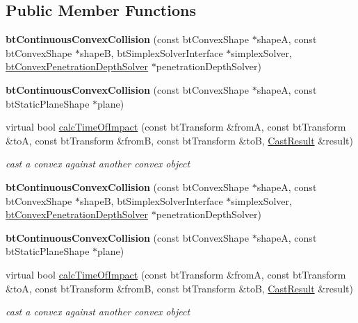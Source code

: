 \subsection*{Public Member Functions}
\begin{DoxyCompactItemize}
\item 
\mbox{\label{classbtContinuousConvexCollision_a6c89f3b4ba10699790f486c1ab278159}} 
{\bfseries bt\+Continuous\+Convex\+Collision} (const bt\+Convex\+Shape $\ast$shapeA, const bt\+Convex\+Shape $\ast$shapeB, bt\+Simplex\+Solver\+Interface $\ast$simplex\+Solver, \hyperlink{classbtConvexPenetrationDepthSolver}{bt\+Convex\+Penetration\+Depth\+Solver} $\ast$penetration\+Depth\+Solver)
\item 
\mbox{\label{classbtContinuousConvexCollision_a5ee898b00f7a69d8815a4a9e90bef415}} 
{\bfseries bt\+Continuous\+Convex\+Collision} (const bt\+Convex\+Shape $\ast$shapeA, const bt\+Static\+Plane\+Shape $\ast$plane)
\item 
virtual bool \hyperlink{classbtContinuousConvexCollision_afc75a57bddfeded52781bbd65ee16f37}{calc\+Time\+Of\+Impact} (const bt\+Transform \&fromA, const bt\+Transform \&toA, const bt\+Transform \&fromB, const bt\+Transform \&toB, \hyperlink{structbtConvexCast_1_1CastResult}{Cast\+Result} \&result)
\begin{DoxyCompactList}\small\item\em cast a convex against another convex object \end{DoxyCompactList}\item 
\mbox{\label{classbtContinuousConvexCollision_a6c89f3b4ba10699790f486c1ab278159}} 
{\bfseries bt\+Continuous\+Convex\+Collision} (const bt\+Convex\+Shape $\ast$shapeA, const bt\+Convex\+Shape $\ast$shapeB, bt\+Simplex\+Solver\+Interface $\ast$simplex\+Solver, \hyperlink{classbtConvexPenetrationDepthSolver}{bt\+Convex\+Penetration\+Depth\+Solver} $\ast$penetration\+Depth\+Solver)
\item 
\mbox{\label{classbtContinuousConvexCollision_a5ee898b00f7a69d8815a4a9e90bef415}} 
{\bfseries bt\+Continuous\+Convex\+Collision} (const bt\+Convex\+Shape $\ast$shapeA, const bt\+Static\+Plane\+Shape $\ast$plane)
\item 
\mbox{\label{classbtContinuousConvexCollision_a7c15d7830cbfed7934ed1f441bc394cd}} 
virtual bool \hyperlink{classbtContinuousConvexCollision_a7c15d7830cbfed7934ed1f441bc394cd}{calc\+Time\+Of\+Impact} (const bt\+Transform \&fromA, const bt\+Transform \&toA, const bt\+Transform \&fromB, const bt\+Transform \&toB, \hyperlink{structbtConvexCast_1_1CastResult}{Cast\+Result} \&result)
\begin{DoxyCompactList}\small\item\em cast a convex against another convex object \end{DoxyCompactList}\end{DoxyCompactItemize}


